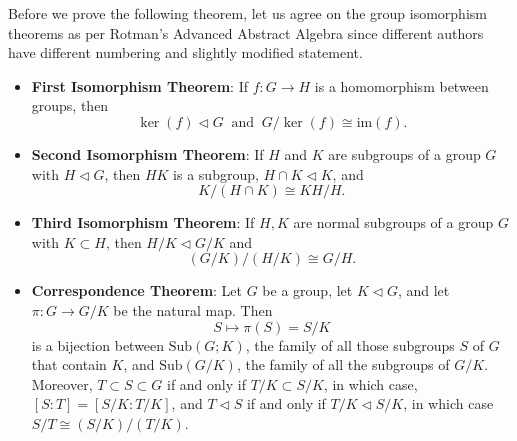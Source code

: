 \documentclass[12pt]{report}
\theoremstyle{definition}
\newcommand{\im}{\text{im}}
\begin{document}
\begin{remark}
	Before we prove the following theorem, let us agree on the group isomorphism theorems as per Rotman's Advanced Abstract Algebra since different authors have different numbering and slightly modified statement.
	\begin{itemize}
		\item \textbf{First Isomorphism Theorem}: If $f:G\to H$ is a homomorphism between groups, then $$\ker(f)\triangleleft G~\mbox{ and }~ G/\ker(f)\cong \im(f).$$
		\item \textbf{Second Isomorphism Theorem}: If $H$ and $K$ are subgroups of a group $G$ with $H\triangleleft G$, then $HK$ is a subgroup, $H\cap K\triangleleft K$, and \[K/(H\cap K)\cong KH/H.\]
		\item \textbf{Third Isomorphism Theorem}: If $H,K$ are normal subgroups of a group $G$ with $K\subset H$, then $H/K\triangleleft G/K$ and \[(G/K)/(H/K)\cong G/H.\]
		\item \textbf{Correspondence Theorem}: Let $G$ be a group, let $K\triangleleft G$, and let $\pi: G\to G/K$ be the natural map. Then \[S\mapsto \pi(S)=S/K\] is a bijection between $\mbox{Sub}(G;K)$, the family of all those subgroups $S$ of $G$ that contain $K$, and $\mbox{Sub}(G/K)$, the family of all the subgroups of $G/K$. Moreover, $T\subset S\subset G$ if and only if $T/K\subset S/K$, in which case, $[S:T]=[S/K:T/K]$, and $T\triangleleft S$ if and only if $T/K\triangleleft S/K$, in which case $S/T\cong (S/K)/(T/K)$.
	\end{itemize}
\end{remark}
\end{document}
